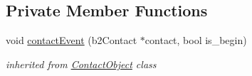 \subsection*{Private Member Functions}
\begin{DoxyCompactItemize}
\item 
\mbox{\label{class_danger_object_a542702fda89ff9549866d9b93a603fbb}} 
void \hyperlink{class_danger_object_a542702fda89ff9549866d9b93a603fbb}{contact\+Event} (b2\+Contact $\ast$contact, bool is\+\_\+begin)
\begin{DoxyCompactList}\small\item\em inherited from \hyperlink{class_contact_object}{Contact\+Object} class \end{DoxyCompactList}\end{DoxyCompactItemize}
